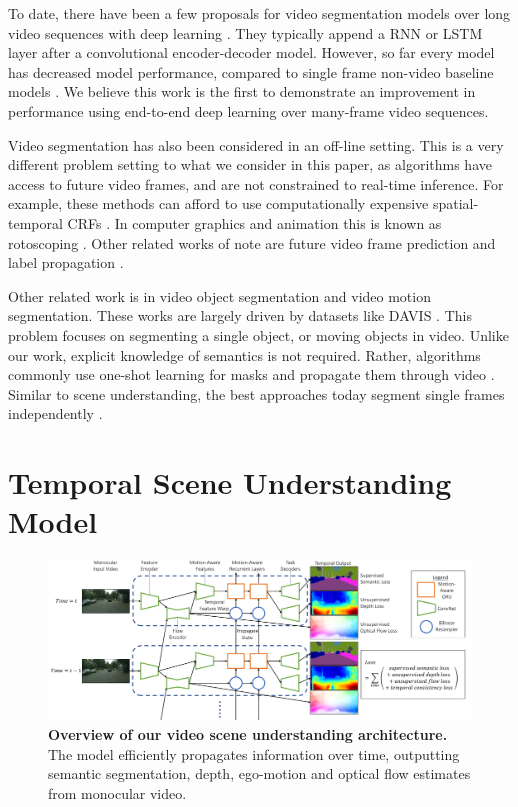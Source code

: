 To date, there have been a few proposals for video segmentation models over long video sequences with deep learning \cite{patraucean2015spatio,valipour2017recurrent}. They typically append a RNN or LSTM layer after a convolutional encoder-decoder model. However, so far every model has decreased model performance, compared to single frame non-video baseline models \cite{patraucean2015spatio,valipour2017recurrent}. We believe this work is the first to demonstrate an improvement in performance using end-to-end deep learning over many-frame video sequences.

Video segmentation has also been considered in an off-line setting. This is a very different problem setting to what we consider in this paper, as algorithms have access to future video frames, and are not constrained to real-time inference. For example, these methods can afford to use computationally expensive spatial-temporal CRFs \cite{kundu2016feature}. In computer graphics and animation this is known as rotoscoping \cite{miksik2017roam}. Other related works of note are future video frame prediction \cite{luc2017predicting} and label propagation \cite{budvytis2010label}.

Other related work is in video object segmentation and video motion segmentation. These works are largely driven by datasets like DAVIS \cite{Perazzi2016}. This problem focuses on segmenting a single object, or moving objects \cite{tsai2016video,tokmakov2017learning,vertens2017smsnet} in video. Unlike our work, explicit knowledge of semantics is not required. Rather, algorithms commonly use one-shot learning for masks and propagate them through video \cite{voigtlaender17BMVC}. Similar to scene understanding, the best approaches today segment single frames independently \cite{caelles2017one,khoreva2016learning}.

\section{Temporal Scene Understanding Model}
\label{sec:model}

\begin{figure}[!t]
\begin{center}
\includegraphics[width=\linewidth]{temporal_model.pdf}
\end{center}
\vspace{-5mm}
   \caption[Video scene understanding architecture.]{\textbf{Overview of our video scene understanding architecture.} The model efficiently propagates information over time, outputting semantic segmentation, depth, ego-motion and optical flow estimates from monocular video.}
\label{fig:arch}
\vspace{-2mm}
\end{figure}

